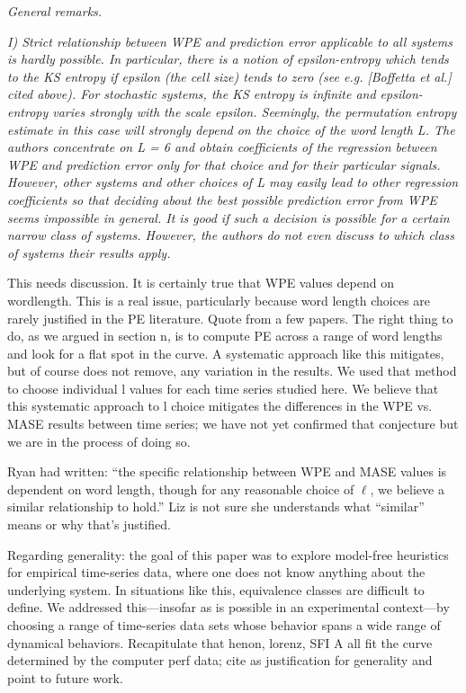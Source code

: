 \documentclass[12pt]{article}
\newcommand{\alert}[1]{{\color{red}#1}}
\begin{document}
{\noindent\emph{General remarks.}

\emph{I) Strict relationship between WPE and prediction error
  applicable to all systems is hardly possible. In particular, there
  is a notion of epsilon-entropy which tends to the KS entropy if
  epsilon (the cell size) tends to zero (see e.g.  [Boffetta et al.]
  cited above). For stochastic systems, the KS entropy is infinite and
  epsilon-entropy varies strongly with the scale epsilon. Seemingly,
  the permutation entropy estimate in this case will strongly depend
  on the choice of the word length L. The authors concentrate on L = 6
  and obtain coefficients of the regression between WPE and prediction
  error only for that choice and for their particular
  signals. However, other systems and other choices of L may easily
  lead to other regression coefficients so that deciding about the
  best possible prediction error from WPE seems impossible in
  general. It is good if such a decision is possible for a certain
  narrow class of systems. However, the authors do not even discuss to
  which class of systems their results apply.}

\alert{This needs discussion.  It is certainly true that WPE values
  depend on wordlength.  This is a real issue, particularly because
  word length choices are rarely justified in the PE literature.
  Quote from a few papers.  The right thing to do, as we argued in
  section n, is to compute PE across a range of word lengths and look
  for a flat spot in the curve.  A systematic approach like this
  mitigates, but of course does not remove, any variation in the
  results.  We used that method to choose individual l values for each
  time series studied here.  We believe that this systematic approach
  to l choice mitigates the differences in the WPE vs. MASE results
  between time series; we have not yet confirmed that conjecture but
  we are in the process of doing so.

Ryan had written: ``the specific relationship between WPE and MASE
values is dependent on word length, though for any reasonable choice
of $\ell$, we believe a similar relationship to hold.'' Liz is not
sure she understands what ``similar'' means or why that's justified.}

Regarding generality: the goal of this paper was to explore model-free
heuristics for empirical time-series data, where one does not know
anything about the underlying system.  In situations like this,
equivalence classes are difficult to define.  We addressed
this---insofar as is possible in an experimental context---by choosing
a range of time-series data sets whose behavior spans a wide range of
dynamical behaviors.  Recapitulate that henon, lorenz, SFI A all fit
the curve determined by the computer perf data; cite as justification
for generality and point to future work.

}
\end{document}
